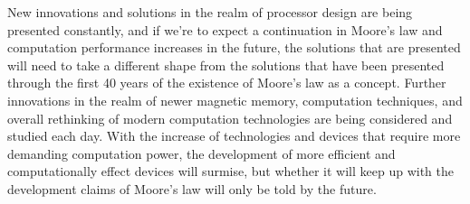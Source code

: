 \documentclass[12pt]{article}
\begin{document}
\begin{flushleft}
New innovations and solutions in the realm of processor
design are being presented constantly, and if we're
to expect a continuation in Moore's law and computation
performance increases in the future, the solutions
that are presented will need to take a different shape
from the solutions that have been presented through
the first 40 years of the existence of Moore's law
as a concept. Further innovations in the realm of newer
magnetic memory, computation techniques, and overall
rethinking of modern computation technologies are being
considered and studied each day. With the increase
of technologies and devices that require more demanding
computation power, the development of more efficient
and computationally effect devices will surmise, but
whether it will keep up with the development claims
of Moore's law will only be told by the future.



\newpage


\newpage
\nocite{*}
\printbibliography

\end{flushleft}
\end{document}
